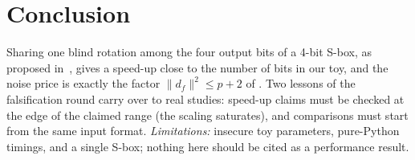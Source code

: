 \section{Conclusion}\label{sec:conclusion}
Sharing one blind rotation among the four output bits of a 4-bit S-box, as proposed
in~\cite{CIM19}, gives a speed-up close to the number of bits in our toy, and the noise price
is exactly the factor $\|d_f\|^2\le p+2$ of . Two lessons of the falsification
round carry over to real studies: speed-up claims must be checked at the edge of the claimed
range (the scaling saturates), and comparisons must start from the same input format.
\emph{Limitations:} insecure toy parameters, pure-Python timings, and a single S-box; nothing
here should be cited as a performance result.
